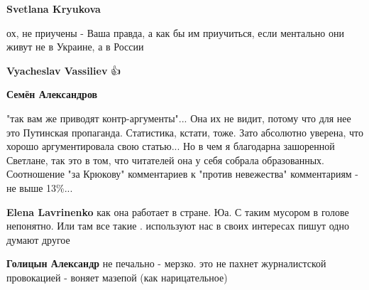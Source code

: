 \begin{itemize}
\begin{itemize}
 
\textbf{Svetlana Kryukova} 

ох, не приучены - Ваша правда, а как бы им приучиться, если ментально они живут
не в Украине, а в России

 
\textbf{Vyacheslav Vassiliev}
👍

 
\textbf{Семён Александров} 

"так вам же приводят контр-аргументы"... Она их не видит, потому что для нее это
Путинская пропаганда. Статистика, кстати, тоже. Зато абсолютно уверена, что
хорошо аргументировала свою статью... Но в чем я благодарна зашоренной Светлане,
так это в том, что читателей она у себя собрала образованных. Соотношение "за
Крюкову" комментариев к "против невежества" комментариям - не выше 13\%...

 
\textbf{Elena Lavrinenko} как она работает в стране. Юа. С таким мусором в голове непонятно. Или там все такие . используют нас в своих интересах пишут одно думают другое

 
\textbf{Голицын Александр} не печально - мерзко. это не пахнет журналистской провокацией - воняет мазепой (как нарицательное)

 

\end{itemize}
\end{itemize}
